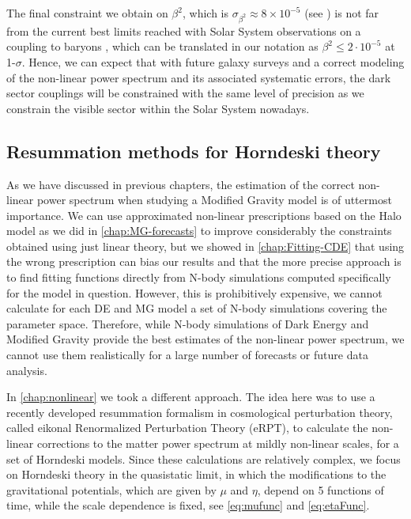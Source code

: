 The final constraint we obtain on $\beta^2$, which is $\sigma_{\beta^2} \approx 8\times 10^{-5}$ (see \cite{casas_fitting_2016})
is not far from the current
best limits reached with Solar System observations on a coupling to
baryons \cite{Agashe:2014kda}, which can be translated in our notation
as $\beta^{2}\le2\cdot10^{-5}$ at 1-$\sigma$.
Hence, we can expect that with future galaxy surveys and a correct modeling of the non-linear power spectrum and its associated
systematic errors, the dark sector couplings will be constrained with the same level of precision as we constrain the visible sector
within the Solar System nowadays.

\subsection*{Resummation methods for Horndeski theory}

As we have discussed in previous chapters, the estimation of the correct non-linear power spectrum when studying a Modified Gravity model
is of uttermost importance. We can use approximated non-linear prescriptions based on the Halo model as we did in \cref{chap:MG-forecasts}
to improve considerably the constraints obtained using just linear theory,
but we showed in \cref{chap:Fitting-CDE} that using the wrong prescription can bias our results and that the more precise approach is to 
find fitting functions directly from N-body simulations computed specifically for the model in question.
However, this is prohibitively expensive, we cannot calculate for each DE and MG model a set of N-body simulations covering
the parameter space. Therefore, while N-body simulations of Dark Energy and Modified Gravity provide 
the best estimates of the non-linear power spectrum, we cannot use them realistically for a large number of forecasts or future data analysis.

In \cref{chap:nonlinear} we took a different approach. The idea here was to use a recently developed resummation
formalism in cosmological perturbation theory, \\ called eikonal Renormalized Perturbation Theory (eRPT), to calculate 
the non-linear corrections to the matter power spectrum at mildly non-linear scales, for a set of Horndeski models.
Since these calculations are relatively complex, we focus on Horndeski theory in the quasistatic limit,
in which the modifications to the gravitational potentials, which are given by $\mu$ and $\eta$, depend on 5 functions
of time, while the scale dependence is fixed, see \cref{eq:mufunc} and \cref{eq:etaFunc}.

